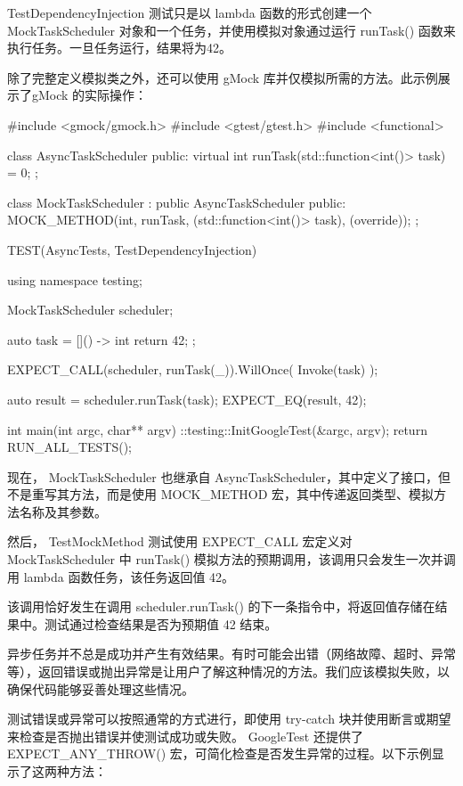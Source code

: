 TestDependencyInjection 测试只是以 lambda 函数的形式创建一个 MockTaskScheduler 对象和一个任务，并使用模拟对象通过运行 runTask() 函数来执行任务。一旦任务运行，结果将为42。

除了完整定义模拟类之外，还可以使用 gMock 库并仅模拟所需的方法。此示例展示了gMock 的实际操作：

\begin{cpp}
#include <gmock/gmock.h>
#include <gtest/gtest.h>
#include <functional>

class AsyncTaskScheduler {
    public:
    virtual int runTask(std::function<int()> task) = 0;
};

class MockTaskScheduler : public AsyncTaskScheduler {
    public:
    MOCK_METHOD(int, runTask, (std::function<int()> task), (override));
};

TEST(AsyncTests, TestDependencyInjection) {
    using namespace testing;

    MockTaskScheduler scheduler;

    auto task = []() -> int {
        return 42;
    };

    EXPECT_CALL(scheduler, runTask(_)).WillOnce(
        Invoke(task)
    );

    auto result = scheduler.runTask(task);
    EXPECT_EQ(result, 42);
}

int main(int argc, char** argv) {
    ::testing::InitGoogleTest(&argc, argv);
    return RUN_ALL_TESTS();
}
\end{cpp}

现在， MockTaskScheduler 也继承自 AsyncTaskScheduler，其中定义了接口，但不是重写其方法，而是使用 MOCK\_METHOD 宏，其中传递返回类型、模拟方法名称及其参数。

然后， TestMockMethod 测试使用 EXPECT\_CALL 宏定义对 MockTaskScheduler 中 runTask() 模拟方法的预期调用，该调用只会发生一次并调用 lambda 函数任务，该任务返回值 42。

该调用恰好发生在调用 scheduler.runTask() 的下一条指令中，将返回值存储在结果中。测试通过检查结果是否为预期值 42 结束。


异步任务并不总是成功并产生有效结果。有时可能会出错（网络故障、超时、异常等），返回错误或抛出异常是让用户了解这种情况的方法。我们应该模拟失败，以确保代码能够妥善处理这些情况。

测试错误或异常可以按照通常的方式进行，即使用 try-catch 块并使用断言或期望来检查是否抛出错误并使测试成功或失败。 GoogleTest 还提供了 EXPECT\_ANY\_THROW() 宏，可简化检查是否发生异常的过程。以下示例显示了这两种方法：

